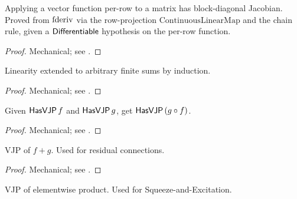 \begin{theorem}
  \label{ax:pdivMat_rowIndep}
  \leanok
  Applying a vector function per-row to a matrix has block-diagonal Jacobian.
  Proved from \(\operatorname{fderiv}\) via the row-projection \(\mathrm{ContinuousLinearMap}\)
  and the chain rule, given a \(\mathsf{Differentiable}\) hypothesis on the
  per-row function.
\end{theorem}

\begin{proof}
\leanok
Mechanical; see .
\end{proof}

\begin{theorem}
  \label{thm:pdiv_finset_sum}
  \leanok
  Linearity extended to arbitrary finite sums by induction.
\end{theorem}

\begin{proof}
\leanok
Mechanical; see .
\end{proof}

\begin{theorem}
  \label{thm:vjp_comp}
  \leanok
  Given \(\mathsf{HasVJP}\, f\) and \(\mathsf{HasVJP}\, g\), get \(\mathsf{HasVJP}\, (g \circ f)\).
\end{theorem}

\begin{proof}
\leanok
Mechanical; see .
\end{proof}

\begin{theorem}
  \label{thm:biPath_has_vjp}
  \leanok
  VJP of \(f + g\). Used for residual connections.
\end{theorem}

\begin{proof}
\leanok
Mechanical; see .
\end{proof}

\begin{theorem}
  \label{thm:elemwiseProduct_has_vjp}
  \leanok
  VJP of elementwise product. Used for Squeeze-and-Excitation.
\end{theorem}

